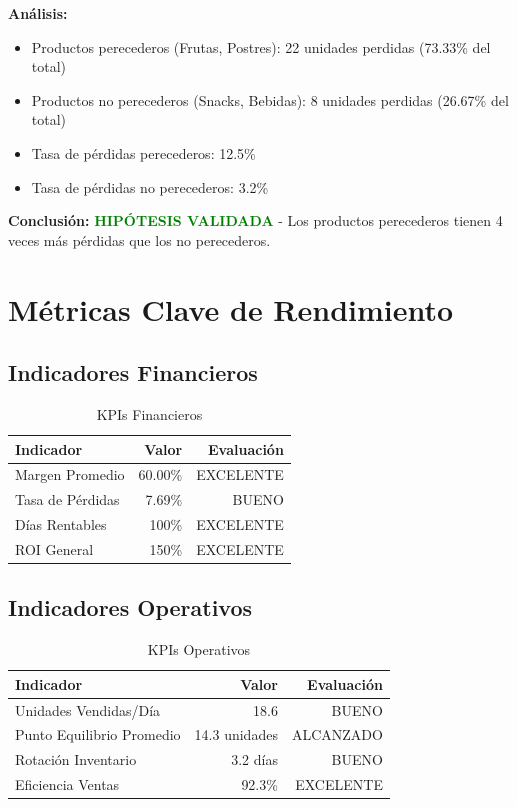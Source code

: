 \documentclass[12pt,a4paper]{article}
\begin{document}
\textbf{Análisis:}
\begin{itemize}
    \item Productos perecederos (Frutas, Postres): 22 unidades perdidas (73.33\% del total)
    \item Productos no perecederos (Snacks, Bebidas): 8 unidades perdidas (26.67\% del total)
    \item Tasa de pérdidas perecederos: 12.5\%
    \item Tasa de pérdidas no perecederos: 3.2\%
\end{itemize}

\textbf{Conclusión:} \textcolor{green}{\textbf{HIPÓTESIS VALIDADA}} - Los productos perecederos tienen 4 veces más pérdidas que los no perecederos.

\section{Métricas Clave de Rendimiento}

\subsection{Indicadores Financieros}
\begin{table}[h!]
\centering
\caption{KPIs Financieros}
\begin{tabular}{|l|r|r|}
\hline
\textbf{Indicador} & \textbf{Valor} & \textbf{Evaluación} \\
\hline
Margen Promedio & 60.00\% & EXCELENTE \\
Tasa de Pérdidas & 7.69\% & BUENO \\
Días Rentables & 100\% & EXCELENTE \\
ROI General & 150\% & EXCELENTE \\
\hline
\end{tabular}
\end{table}

\subsection{Indicadores Operativos}
\begin{table}[h!]
\centering
\caption{KPIs Operativos}
\begin{tabular}{|l|r|r|}
\hline
\textbf{Indicador} & \textbf{Valor} & \textbf{Evaluación} \\
\hline
Unidades Vendidas/Día & 18.6 & BUENO \\
Punto Equilibrio Promedio & 14.3 unidades & ALCANZADO \\
Rotación Inventario & 3.2 días & BUENO \\
Eficiencia Ventas & 92.3\% & EXCELENTE \\
\hline
\end{tabular}
\end{table}
\end{document}

